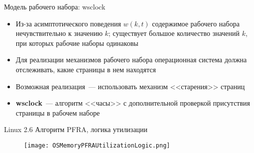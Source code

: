 \documentclass[aspectratio=169,14pt]{beamer}
\begin{document}
\begin{frame}{Модель рабочего набора: wsclock}
    \begin{footnotesize}
    \begin{itemize}
        \item Из-за асимптотического поведения $w(k,t)$ содержимое рабочего
        набора нечувствительно к значению $k$; существует большое количество
        значений $k$, при которых рабочие наборы одинаковы
        \item Для реализации механизмов рабочего набора операционная
        система должна отслеживать, какие страницы в нем находятся
        \item Возможная реализация~--- использовать механизм <<старения>>
        страниц
        \begin{itemize}
        \end{itemize}
        \item \textbf{wsclock}~--- алгоритм <<часы>> с дополнительной проверкой
        присутствия страницы в рабочем наборе
    \end{itemize}
    \end{footnotesize}
\end{frame}

\begin{frame}{Linux 2.6 Алгоритм PFRA, логика утилизации}
    \begin{figure}[htp]
        \centering
        \texttt{[image: OSMemoryPFRAUtilizationLogic.png]}
    \end{figure}
\end{frame}
\end{document}

